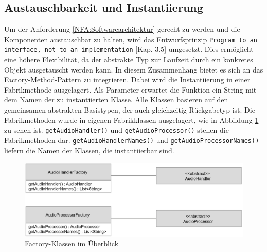 \subsection{Austauschbarkeit und Instantiierung}
Um der Anforderung \ref{NFA:Softwarearchitektur} gerecht zu werden und die Komponenten austauschbar zu halten, wird das Entwurfsprinzip \texttt{Program to an interface, not to an implementation} \cite{Lahres2009}[Kap. 3.5] umgesetzt. Dies ermöglicht eine höhere Flexibilität, da der abstrakte Typ zur Laufzeit durch ein konkretes Objekt ausgetauscht werden kann. In diesem Zusammenhang bietet es sich an das Factory-Method-Pattern zu integrieren. Dabei wird die Instantiierung in einer Fabrikmethode ausgelagert. Als Parameter erwartet die Funktion ein String mit dem Namen der zu instantiierten Klasse. Alle Klassen basieren auf den gemeinsamen abstrakten Basistypen, der auch gleichzeitig Rückgabetyp ist. Die Fabrikmethoden wurde in eigenen Fabrikklassen ausgelagert, wie in Abbildung \ref{Fig:Factories} zu sehen ist. \texttt{getAudioHandler()} und \texttt{getAudioProcessor()} stellen die Fabrikmethoden dar. \texttt{getAudioHandlerNames()} und \texttt{getAudioProcessorNames()} liefern die Namen der Klassen, die instantiierbar sind.
\newline
\begin{figure}[htp]
\centering
\includegraphics[width=1\textwidth]{../img/Factories}
\caption{Factory-Klassen im Überblick}
\label{Fig:Factories}
\end{figure}

\FloatBarrier

